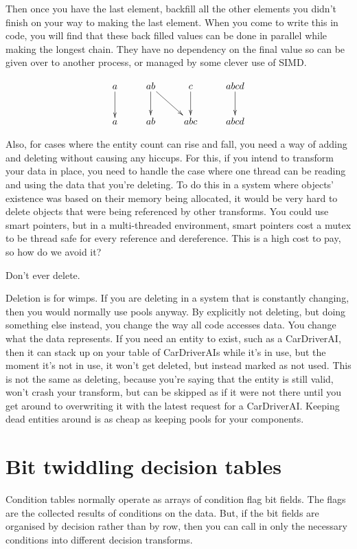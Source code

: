 Then once you have the last element, backfill all the other elements you didn't
finish on your way to making the last element. When you come to write this in
code, you will find that these back filled values can be done in parallel while
making the longest chain. They have no dependency on the final value so can be
given over to another process, or managed by some clever use of SIMD.

\begin{displaymath}
	\xymatrix{
	a \ar[d] & ab \ar[d] \ar[dr] & c \ar[d] & abcd \ar[d] \\
	a & ab & abc & abcd }
\end{displaymath}

Also, for cases where the entity count can rise and fall, you need a way of
adding and deleting without causing any hiccups. For this, if you intend to
transform your data in place, you need to handle the case where one thread can
be reading and using the data that you're deleting. To do this in a system
where objects' existence was based on their memory being allocated, it would be
very hard to delete objects that were being referenced by other transforms. You
could use smart pointers, but in a multi-threaded environment, smart pointers
cost a mutex to be thread safe for every reference and dereference. This is a
high cost to pay, so how do we avoid it?

Don't ever delete.

Deletion is for wimps. If you are deleting in a system that is constantly
changing, then you would normally use pools anyway. By explicitly not deleting,
but doing something else instead, you change the way all code accesses data.
You change what the data represents. If you need an entity to exist, such as a
CarDriverAI, then it can stack up on your table of CarDriverAIs while it's in
use, but the moment it's not in use, it won't get deleted, but instead marked
as not used. This is not the same as deleting, because you're saying that the
entity is still valid, won't crash your transform, but can be skipped as if it
were not there until you get around to overwriting it with the latest request
for a CarDriverAI. Keeping dead entities around is as cheap as keeping pools
for your components.

\section{Bit twiddling decision tables}

Condition tables normally operate as arrays of condition flag bit fields. The
flags are the collected results of conditions on the data. But, if the bit
fields are organised by decision rather than by row, then you can call in only
the necessary conditions into different decision transforms.

